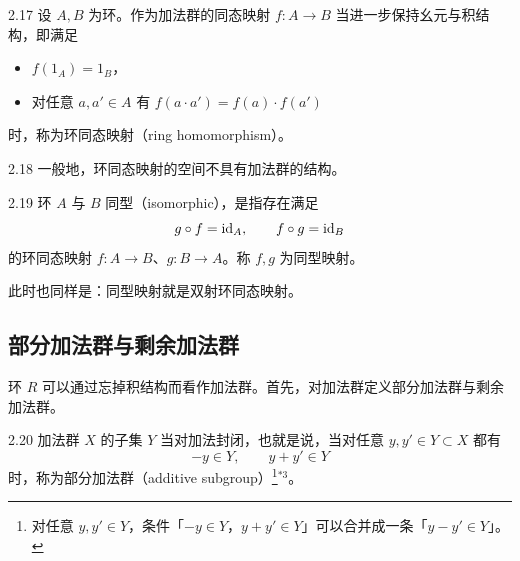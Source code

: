 \begin{definition}{2.17} 设 $A,B$ 为环。作为加法群的同态映射 $f\colon A\to B$ 当进一步保持幺元与积结构，即满足
\begin{itemize}
  \item $f(1_A)=1_B$，
  \item 对任意 $a,a'\in A$ 有 $f(a\cdot a')=f(a)\cdot f(a')$
\end{itemize}
时，称为环同态映射（ring homomorphism）。\end{definition}

\begin{remark}{2.18} 一般地，环同态映射的空间不具有加法群的结构。\end{remark}


\begin{definition}{2.19} 环 $A$ 与 $B$ 同型（isomorphic），是指存在满足
\[
  g\circ f=\mathrm{id}_A,\qquad f\circ g=\mathrm{id}_B
\]
的环同态映射 $f\colon A\to B$、$g\colon B\to A$。称 $f,g$ 为同型映射。\end{definition}

此时也同样是：同型映射就是双射环同态映射。

\subsection{部分加法群与剩余加法群}

环 $R$ 可以通过忘掉积结构而看作加法群。首先，对加法群定义部分加法群与剩余加法群。

\begin{definition}{2.20} 加法群 $X$ 的子集 $Y$ 当对加法封闭，也就是说，当对任意 $y,y'\in Y\subset X$ 都有
\[
  -y\in Y,\qquad y+y'\in Y
\]
时，称为部分加法群（additive subgroup）\footnote{对任意 $y,y'\in Y$，条件「$-y\in Y$，$y+y'\in Y$」可以合并成一条「$y-y'\in Y$」。}$^{*3}$。\end{definition}



